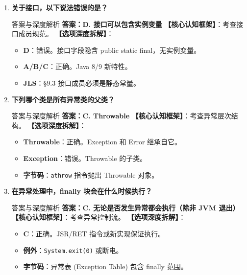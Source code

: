 \documentclass[12pt, a4paper]{ctexart}
\newcommand{\code}[1]{\texttt{\color{myblue}#1}}
\begin{document}
\begin{enumerate}[label=\arabic*.]
	\item \textbf{关于接口，以下说法错误的是？}
	      \begin{bluebox}{答案与深度解析}
		      \textbf{答案：D. 接口可以包含实例变量}
		      \textbf{【核心认知框架】}：考查接口成员规范。
		      \textbf{【选项深度拆解】}：
		      \begin{itemize}[leftmargin=*, nosep]
			      \item \textbf{D}：错误。接口字段隐含 public static final，无实例变量。
			      \item \textbf{A/B/C}：正确。Java 8/9 新特性。
			      \item \textbf{JLS}：§9.3 接口成员必须是静态常量。
		      \end{itemize}
	      \end{bluebox}

	\item \textbf{下列哪个类是所有异常类的父类？}
	      \begin{bluebox}{答案与深度解析}
		      \textbf{答案：C. Throwable}
		      \textbf{【核心认知框架】}：考查异常层次结构。
		      \textbf{【选项深度拆解】}：
		      \begin{itemize}[leftmargin=*, nosep]
			      \item \textbf{Throwable}：正确。Exception 和 Error 继承自它。
			      \item \textbf{Exception}：错误。Throwable 的子类。
			      \item \textbf{字节码}：\code{athrow} 指令抛出 Throwable 对象。
		      \end{itemize}
	      \end{bluebox}

	\item \textbf{在异常处理中，finally 块会在什么时候执行？}
	      \begin{bluebox}{答案与深度解析}
		      \textbf{答案：C. 无论是否发生异常都会执行（除非 JVM 退出）}
		      \textbf{【核心认知框架】}：考查异常控制流。
		      \textbf{【选项深度拆解】}：
		      \begin{itemize}[leftmargin=*, nosep]
			      \item \textbf{C}：正确。JSR/RET 指令或新实现保证执行。
			      \item \textbf{例外}：\code{System.exit(0)} 或断电。
			      \item \textbf{字节码}：异常表 (Exception Table) 包含 finally 范围。
		      \end{itemize}
	      \end{bluebox}


\end{enumerate}
\end{document}
